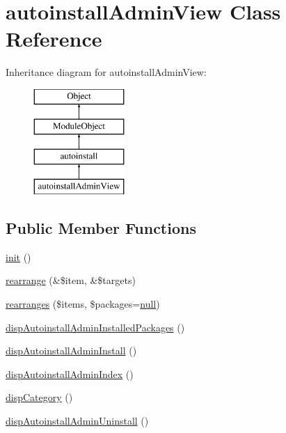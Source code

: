 \hypertarget{classautoinstallAdminView}{}\section{autoinstall\+Admin\+View Class Reference}
\label{classautoinstallAdminView}
Inheritance diagram for autoinstall\+Admin\+View\+:\begin{figure}[H]
\begin{center}
\leavevmode
\includegraphics[height=4.000000cm]{classautoinstallAdminView}
\end{center}
\end{figure}
\subsection*{Public Member Functions}
\begin{DoxyCompactItemize}
\item 
\hyperlink{classautoinstallAdminView_a206401d0dc48b6d0e60f1520ba972526}{init} ()
\item 
\hyperlink{classautoinstallAdminView_a55e52a58461106215866abf53264edb5}{rearrange} (\&\$item, \&\$targets)
\item 
\hyperlink{classautoinstallAdminView_a16c6adf0c6d6f8bb24851dd5b68416f5}{rearranges} (\$items, \$packages=\hyperlink{modernizr_8min_8js_a286f9ec831c5e676eeb493248eab9575}{null})
\item 
\hyperlink{classautoinstallAdminView_a57de04bc93c4b62ad0c8fff257b4a837}{disp\+Autoinstall\+Admin\+Installed\+Packages} ()
\item 
\hyperlink{classautoinstallAdminView_a096fdb7d03bea9f0b1a48dd5f471bbd2}{disp\+Autoinstall\+Admin\+Install} ()
\item 
\hyperlink{classautoinstallAdminView_af3c3bcabc77b8e0d812db60bfc8bc621}{disp\+Autoinstall\+Admin\+Index} ()
\item 
\hyperlink{classautoinstallAdminView_ac3b285aaf0eb96bbfb2986917ca3571b}{disp\+Category} ()
\item 
\hyperlink{classautoinstallAdminView_a5f7303fa7b93ab464b65e0917b8d75ca}{disp\+Autoinstall\+Admin\+Uninstall} ()
\end{DoxyCompactItemize}
